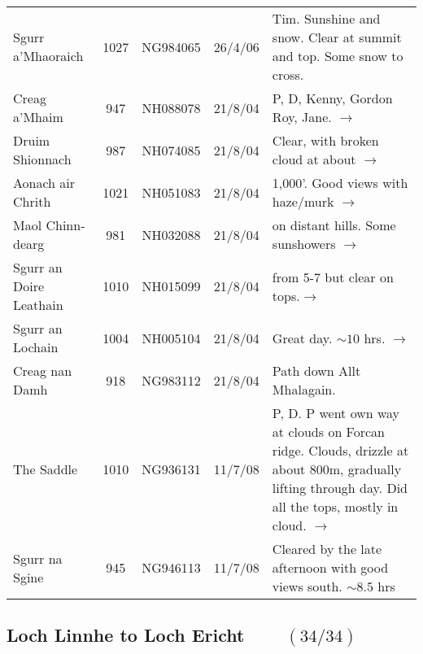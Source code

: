 \documentclass[10pt,a4paper]{article}
\begin{document}
\begin{tabular}{lcccp{6cm}}
Sgurr a'Mhaoraich  & 1027  & NG984065& 26/4/06&Tim. Sunshine and snow. Clear at summit and top.
Some snow to cross.\\
Creag a'Mhaim & 947 & NH088078 &21/8/04&P, D, Kenny, Gordon Roy, Jane. $\rightarrow$ \\
Druim Shionnach & 987  & NH074085 &21/8/04 &Clear, with broken cloud at about  $\rightarrow$  \\
Aonach air Chrith & 1021 & NH051083&21/8/04& 1,000'. Good views with haze/murk $\rightarrow$\\
Maol Chinn-dearg & 981  & NH032088  &21/8/04&  on distant hills. Some sunshowers  $\rightarrow$\\
Sgurr an Doire Leathain  & 1010  & NH015099&21/8/04& from  5-7 but clear on tops.$\rightarrow$\\
Sgurr an Lochain  & 1004  & NH005104 &21/8/04&Great day. $\sim 10$ hrs. $\rightarrow$\\
Creag nan Damh & 918 & NG983112 &21/8/04&Path down Allt Mhalagain.\\
The Saddle  & 1010  & NG936131  & 11/7/08&P, D. P went own way at clouds on Forcan ridge. Clouds, drizzle at
about 800m, gradually lifting through day. Did all the tops, mostly in cloud. $\rightarrow$\\
Sgurr na Sgine & 945  & NG946113  & 11/7/08& Cleared by the late afternoon with good views south.
$\sim 8.5$ hrs\\
\end{tabular}


\newpage

\subsection*{Loch Linnhe to Loch Ericht $\qquad (34/34)$}
\end{document}
